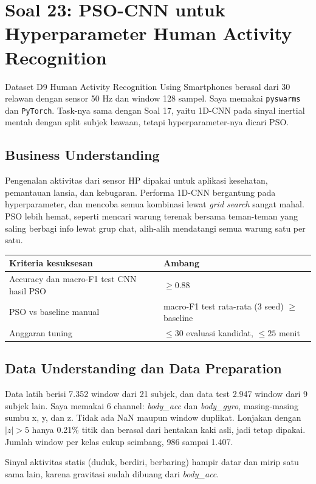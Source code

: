 \newpage
\section{Soal 23: PSO-CNN untuk Hyperparameter Human Activity Recognition}

Dataset D9 Human Activity Recognition Using Smartphones berasal dari 30 relawan dengan sensor 50 Hz dan window 128 sampel. Saya memakai \texttt{pyswarms} dan \texttt{PyTorch}. Task-nya sama dengan Soal 17, yaitu 1D-CNN pada sinyal inertial mentah dengan split subjek bawaan, tetapi hyperparameter-nya dicari PSO.

\subsection{Business Understanding}
Pengenalan aktivitas dari sensor HP dipakai untuk aplikasi kesehatan, pemantauan lansia, dan kebugaran. Performa 1D-CNN bergantung pada hyperparameter, dan mencoba semua kombinasi lewat \emph{grid search} sangat mahal. PSO lebih hemat, seperti mencari warung terenak bersama teman-teman yang saling berbagi info lewat grup chat, alih-alih mendatangi semua warung satu per satu.

\begin{tabularx}{\textwidth}{@{}LL@{}}
\toprule
\textbf{Kriteria kesuksesan} & \textbf{Ambang} \\
\midrule
Accuracy dan macro-F1 test CNN hasil PSO & $\geq 0.88$ \\
PSO vs baseline manual & macro-F1 test rata-rata (3 seed) $\geq$ baseline \\
Anggaran tuning & $\leq 30$ evaluasi kandidat, $\leq 25$ menit \\
\bottomrule
\end{tabularx}

\subsection{Data Understanding dan Data Preparation}
Data latih berisi 7.352 window dari 21 subjek, dan data test 2.947 window dari 9 subjek lain. Saya memakai 6 channel: \emph{body\_acc} dan \emph{body\_gyro}, masing-masing sumbu x, y, dan z. Tidak ada NaN maupun window duplikat. Lonjakan dengan $|z| > 5$ hanya 0.21\% titik dan berasal dari hentakan kaki asli, jadi tetap dipakai. Jumlah window per kelas cukup seimbang, 986 sampai 1.407.

Sinyal aktivitas statis (duduk, berdiri, berbaring) hampir datar dan mirip satu sama lain, karena gravitasi sudah dibuang dari \emph{body\_acc}.


